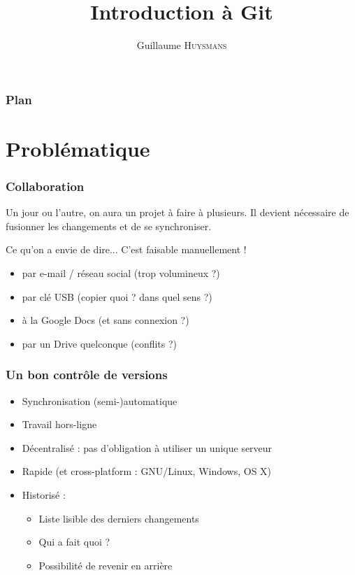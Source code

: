 \documentclass[compress]{beamer}
\title{Introduction à Git}
\author{Guillaume \textsc{Huysmans}}
\newenvironment{envie}
	{\begin{block}{Ce qu'on a envie de dire...}}
	{\end{block}}
\begin{document}
\begin{frame}
	\maketitle
\end{frame}
\begin{frame}
	\frametitle{Plan}
	\tableofcontents
\end{frame}


\section{Problématique}
\begin{frame}
	\frametitle{Collaboration}
	Un jour ou l'autre, on aura un projet à faire à plusieurs.
	Il devient nécessaire de fusionner les changements et de se synchroniser.

	\begin{envie}
	C'est faisable manuellement ! \pause
	\end{envie}

	\begin{itemize}
		\item par e-mail / réseau social \pause (trop volumineux ?) \pause
		\item par clé USB \pause (copier quoi ? dans quel sens ?) \pause
		\item à la Google Docs \pause (et sans connexion ?) \pause
		\item par un Drive quelconque \pause (conflits ?)
	\end{itemize}
\end{frame}

\begin{frame}
	\frametitle{Un bon contrôle de versions}
	\begin{itemize}
		\item Synchronisation (semi-)automatique
		\item Travail hors-ligne
		\item Décentralisé : pas d'obligation à utiliser un unique serveur
		\item Rapide (et cross-platform : GNU/Linux, Windows, OS X)
		\item Historisé :
			\begin{itemize}
				\item Liste lisible des derniers changements
				\item Qui a fait quoi ?
				\item Possibilité de revenir en arrière
			\end{itemize}
	\end{itemize}
\end{frame}
\end{document}
